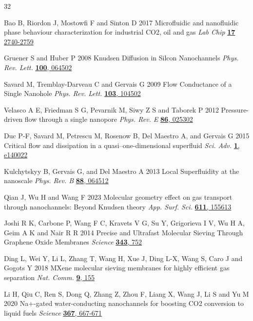 \documentclass[%
 reprint,
 aps,
 prb,
 epsf,
]{revtex4-2}
\begin{document}
\begin{thebibliography}{32}

 Bao B, Riordon J, Mostowfi F and Sinton D 2017 Microfluidic and nanofluidic phase behaviour characterization for industrial CO2, oil and gas \textit{Lab Chip} \href{https://doi.org/10.1039/C7LC00301C}{\textbf{17} 2740-2759}

 Gruener S and Huber P 2008 Knudsen Diffusion in Silcon Nanochannels \textit{Phys. Rev. Lett. } \href {https://doi.org/10.1103/PhysRevLett.100.064502}{\textbf{100}, 064502}

 Savard M, Tremblay-Darveau C and Gervais G 2009 Flow Conductance of a Single Nanohole {\textit{Phys. Rev. Lett. }}\href{https://doi.org/10.1103/PhysRevLett.103.104502}{\textbf{103}, 104502}

 Velasco A E, Friedman S G, Pevarnik M, Siwy Z S and Taborek P 2012 Pressure-driven flow through a single nanopore {\textit{Phys. Rev. E }}\href{https://doi.org/10.1103/PhysRevE.86.025302}{\textbf{86}, 025302}


 Duc P-F, Savard M, Petrescu M, Rosenow B, Del Maestro A, and Gervais G 2015 Critical flow and dissipation in a quasi–one-dimensional superfluid \textit{Sci. Adv. } \href {https://doi.org/10.1126/sciadv.1400222}{ \textbf{1}, e140022}

 Kulchytskyy B, Gervais G, and Del Maestro A 2013 Local Superfluidity at the nanoscale \textit{Phys. Rev. B }\href {https://doi.org/10.1126/sciadv.1400222}{\textbf{88}, 064512}

 Qian J, Wu H  and Wang F 2023 Molecular geometry effect on gas transport through nanochannels: Beyond Knudsen theory \textit{App. Surf. Sci. }  \href {https://doi.org/10.1126/sciadv.1400222}{{\bf 611}, 155613}

 Joshi R K, Carbone P, Wang F C, Kravets V G, Su Y, Grigorieva I V, Wu H A, Geim A K and Nair R R 2014 Precise and Ultrafast Molecular Sieving Through Graphene Oxide Membranes \textit{Science }\href{https://doi.org/10.1126/science.1245711}{{\bf 343}, 752}

 Ding L, Wei Y, Li L, Zhang T, Wang H, Xue J, Ding L-X, Wang S, Caro J and Gogots Y 2018  MXene molecular sieving membranes for highly efficient gas separation \textit{Nat. Comm.} \href {https://doi.org/10.1038/s41467-017-02529-6} {\textbf{9}, 155}



 Li H, Qiu C, Ren S, Dong Q, Zhang Z, Zhou F, Liang X, Wang J, Li S and Yu M 2020 Na+-gated water-conducting nanochannels for boosting CO2 conversion to liquid fuels \textit{Science } \href{https://doi.org/10.1126/science.aaz605}{ {\bf 367}, 667-671}


\end{thebibliography}
\end{document}
